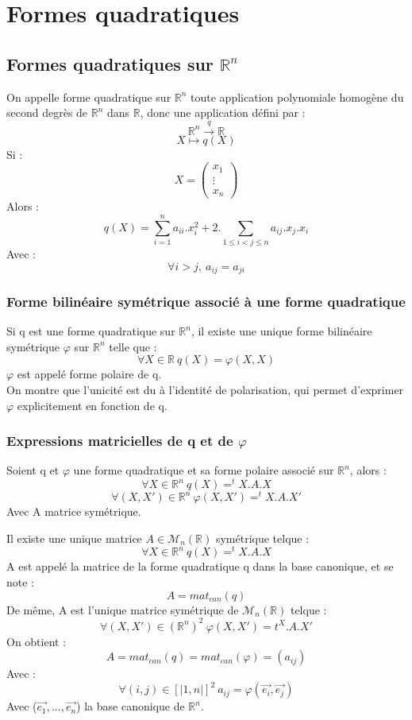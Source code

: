 \chapter{Formes quadratiques}
\section{Formes quadratiques sur $\mathbb{R}^n$}
\begin{de}
On appelle forme quadratique sur $\mathbb{R}^n$ toute application polynomiale homogène du second degrès de $\mathbb{R}^n$ dans $\mathbb{R}$, donc une application défini par : 
$$\mathbb{R}^n \overset{q}\rightarrow \mathbb{R}$$
$$X \mapsto q(X)$$
Si :
$$X = \begin{pmatrix}
       x_1\\
 	\vdots \\
	x_n
      \end{pmatrix}
$$
Alors : 
$$q(X) = \sum_{i=1}^n a_{ii}.x_i^2 + 2.\sum_{1 \leq i < j \leq n} a_{ij}.x_j.x_i$$
Avec : 
$$\forall i > j,~ a_{ij} = a_{ji}$$
\end{de}
\subsection{Forme bilinéaire symétrique associé à une forme quadratique}
\begin{prop}
Si q est une forme quadratique sur $\mathbb{R}^n$, il existe une unique forme bilinéaire symétrique $\varphi$ sur $\mathbb{R}^n$ telle que : 
$$\forall X \in \mathbb{R}~ q(X) = \varphi(X,X)$$
$\varphi$ est appelé forme polaire de q.\\
On montre que l'unicité est du à l'identité de polarisation, qui permet d'exprimer $\varphi$ explicitement en fonction de q.
\end{prop}
\subsection{Expressions matricielles de q et de $\varphi$}
\begin{prop}
Soient q et $\varphi$ une forme quadratique et sa forme polaire associé sur $\mathbb{R}^n$, alors : 
$$\forall X \in \mathbb{R}^n~ q(X) = ^tX.A.X$$
$$\forall(X,X') \in \mathbb{R}^n~ \varphi(X,X') = ^tX.A.X'$$
Avec A matrice symétrique.
\end{prop}
\begin{prop}
Il existe une unique matrice $A \in \mathcal{M}_n(\mathbb{R})$ symétrique telque : 
$$\forall X \in \mathbb{R}^n~ q(X) = ^tX.A.X$$
A est appelé la matrice de la forme quadratique q dans la base canonique, et se note :
$$A = mat_{can}(q)$$
De même, A est l'unique matrice symétrique de $\mathcal{M}_n(\mathbb{R})$ telque : 
$$\forall(X,X') \in (\mathbb{R}^n)^2~ \varphi(X,X') = t^X.A.X'$$
On obtient :
$$A = mat_{can}(q) = mat_{can}(\varphi) = (a_{ij})$$
Avec : 
$$\forall (i,j) \in [|1,n|]^2~ a_{ij} = \varphi(\overrightarrow{e_i},\overrightarrow{e_j})$$
Avec ($\overrightarrow{e_1},...,\overrightarrow{e_n}$) la base canonique de $\mathbb{R}^n$.
\end{prop}
